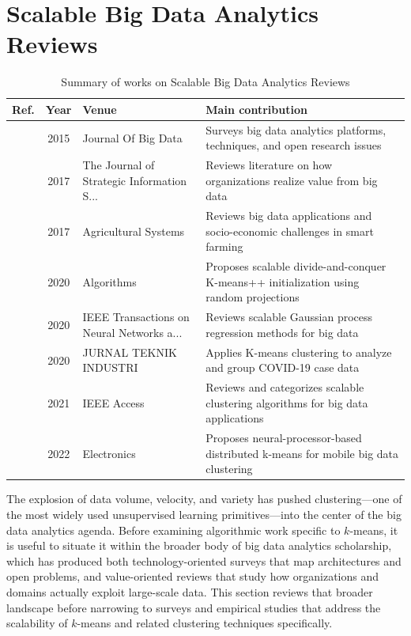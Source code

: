 \section{Scalable Big Data Analytics Reviews}\label{sec:theme6}
\begin{table}[!t]
\centering
\renewcommand{\arraystretch}{1.2}
\caption{Summary of works on Scalable Big Data Analytics Reviews}\label{tab:theme6}
\begin{tabularx}{\textwidth}{@{}l c p{3.6cm} X@{}}
\toprule
\textbf{Ref.} & \textbf{Year} & \textbf{Venue} & \textbf{Main contribution} \\
\midrule
\cite{tsai2015big} & 2015 & Journal Of Big Data & Surveys big data analytics platforms, techniques, and open research issues \\
\cite{gunther2017debating} & 2017 & The Journal of Strategic Information S... & Reviews literature on how organizations realize value from big data \\
\cite{wolfert2017big} & 2017 & Agricultural Systems & Reviews big data applications and socio-economic challenges in smart farming \\
\cite{hamalainen2020improving} & 2020 & Algorithms & Proposes scalable divide-and-conquer K-means++ initialization using random projections \\
\cite{liu2020when} & 2020 & IEEE Transactions on Neural Networks a... & Reviews scalable Gaussian process regression methods for big data \\
\cite{indraputra2020means} & 2020 & JURNAL TEKNIK INDUSTRI & Applies K-means clustering to analyze and group COVID-19 case data \\
\cite{mahdi2021scalable} & 2021 & IEEE Access & Reviews and categorizes scalable clustering algorithms for big data applications \\
\cite{awad2022improved} & 2022 & Electronics & Proposes neural-processor-based distributed k-means for mobile big data clustering \\
\bottomrule
\end{tabularx}
\end{table}

The explosion of data volume, velocity, and variety has pushed clustering---one of the most widely used unsupervised learning primitives---into the center of the big data analytics agenda. Before examining algorithmic work specific to $k$-means, it is useful to situate it within the broader body of big data analytics scholarship, which has produced both technology-oriented surveys that map architectures and open problems, and value-oriented reviews that study how organizations and domains actually exploit large-scale data. This section reviews that broader landscape before narrowing to surveys and empirical studies that address the scalability of $k$-means and related clustering techniques specifically.

